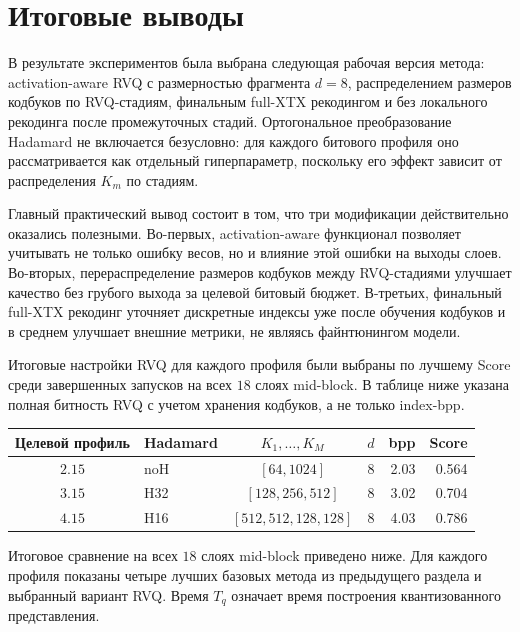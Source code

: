 \documentclass[a4paper,12pt]{article}
\begin{document}
\section{Итоговые выводы}

В результате экспериментов была выбрана следующая рабочая версия метода: activation-aware RVQ с размерностью фрагмента $d=8$, распределением размеров кодбуков по RVQ-стадиям, финальным full-XTX рекодингом и без локального рекодинга после промежуточных стадий. Ортогональное преобразование Hadamard не включается безусловно: для каждого битового профиля оно рассматривается как отдельный гиперпараметр, поскольку его эффект зависит от распределения $K_m$ по стадиям.

Главный практический вывод состоит в том, что три модификации действительно оказались полезными. Во-первых, activation-aware функционал позволяет учитывать не только ошибку весов, но и влияние этой ошибки на выходы слоев. Во-вторых, перераспределение размеров кодбуков между RVQ-стадиями улучшает качество без грубого выхода за целевой битовый бюджет. В-третьих, финальный full-XTX рекодинг уточняет дискретные индексы уже после обучения кодбуков и в среднем улучшает внешние метрики, не являясь файнтюнингом модели.

Итоговые настройки RVQ для каждого профиля были выбраны по лучшему Score среди завершенных запусков на всех $18$ слоях mid-block. В таблице ниже указана полная битность RVQ с учетом хранения кодбуков, а не только index-bpp.

\begin{center}
\small
\begin{tabular}{clcrrr}
\hline
Целевой профиль & Hadamard & $K_1,\ldots,K_M$ & $d$ & bpp & Score \\
\hline
$2.15$ & noH & $[64,1024]$ & 8 & 2.03 & 0.564 \\
$3.15$ & H32 & $[128,256,512]$ & 8 & 3.02 & 0.704 \\
$4.15$ & H16 & $[512,512,128,128]$ & 8 & 4.03 & 0.786 \\
\hline
\end{tabular}
\end{center}

Итоговое сравнение на всех $18$ слоях mid-block приведено ниже. Для каждого профиля показаны четыре лучших базовых метода из предыдущего раздела и выбранный вариант RVQ. Время $T_q$ означает время построения квантизованного представления.
\end{document}
